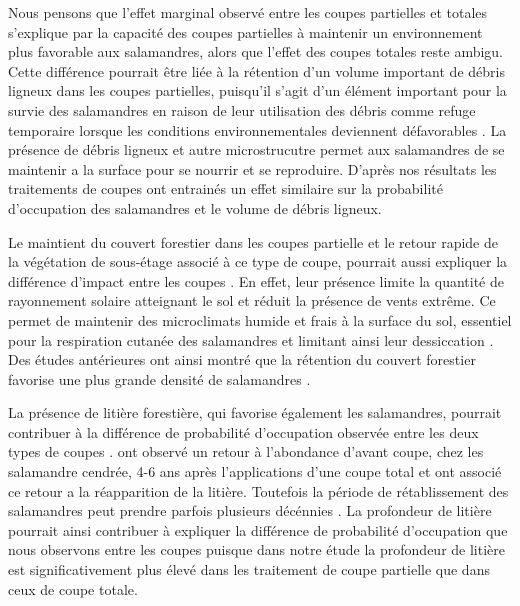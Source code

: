 Nous pensons que l'effet marginal observé entre les coupes partielles et totales s'explique par la capacité des coupes partielles à maintenir un environnement plus favorable aux salamandres, 
alors que l'effet des coupes totales reste ambigu. 
Cette différence pourrait être liée à la rétention d'un volume important de débris ligneux dans les coupes partielles, 
puisqu'il s'agit d'un élément important pour la survie des salamandres en raison de leur utilisation des débris comme refuge temporaire lorsque les conditions environnementales deviennent défavorables \citep{Nolet2018Comparingeffects,Peterman2014Spatialvariation,Achat2015Quantifyingconsequences,Peele2017Effectswoody}.
La présence de débris ligneux et autre microstrucutre permet aux salamandres de se maintenir a la surface pour se nourrir et se reproduire. 
D'après nos résultats les traitements de coupes ont entrainés un effet similaire sur la probabilité d'occupation des salamandres et le volume de débris ligneux.

Le maintient du couvert forestier dans les coupes partielle et le retour rapide de la végétation de sous-étage associé à ce type de coupe, pourrait aussi expliquer la différence d'impact entre les coupes \citep{Raybuck2015silviculturalpractices}.
En effet, leur présence limite la quantité de rayonnement solaire atteignant le sol et réduit la présence de vents extrême. 
Ce permet de maintenir des microclimats humide et frais à la surface du sol, essentiel pour la respiration cutanée des salamandres et limitant ainsi leur dessiccation \citep{Homyack2011Energeticssurfaceactive}. 
Des études antérieures ont ainsi montré que la rétention du couvert forestier favorise une plus grande densité de salamandres \citep{Hocking2013Effectsexperimental,Harper2015Impactforestry,Mahoney2016Woodlandsalamander}. 

La présence de litière forestière, qui favorise également les salamandres, pourrait contribuer à la différence de probabilité d'occupation observée entre les deux types de coupes \citep{Tilghman2012Metaanalysiseffects}.
\cite{Ash1997DisappearanceReturn} ont observé un retour à l'abondance d'avant coupe, chez les salamandre cendrée, 4-6 ans après l'applications d'une coupe total et ont associé ce retour a la réapparition de la litière. 
Toutefois la période de rétablissement des salamandres peut prendre parfois plusieurs décénnies \citep{Homyack2013Effectsrepeatedstand,Ochs2022Responseterrestrial}. 
La profondeur de litière pourrait ainsi contribuer à expliquer la différence de probabilité d'occupation que nous observons entre les coupes puisque dans notre étude la profondeur de litière est significativement plus élevé dans les traitement de coupe partielle que dans ceux de coupe totale.

